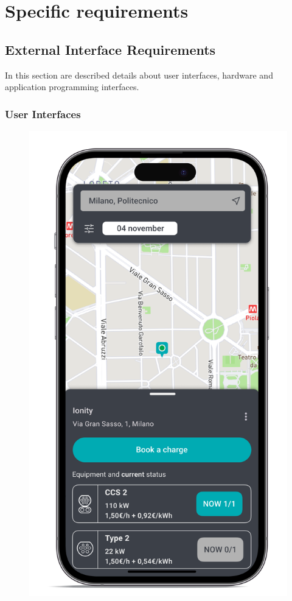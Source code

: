 \section{Specific requirements}

\subsection{External Interface Requirements}
In this section are described details about user interfaces, hardware and application programming interfaces.

\subsubsection{User Interfaces}
\begin{figure}[H]
    \centering
    \includegraphics[scale=0.1]{src/mockups/details.png}
\end{figure} \vspace{1cm}
